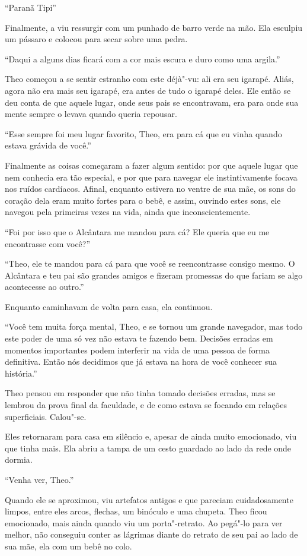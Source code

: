 ``Paranã Tipi''


Finalmente, a viu ressurgir com um punhado de barro verde na mão.
Ela esculpiu um pássaro e colocou para secar sobre uma pedra.

``Daqui a alguns dias ficará com a cor mais escura e duro como uma
argila.''

Theo começou a se sentir estranho com este déjà"-vu: ali era seu igarapé.
Aliás, agora não era mais seu igarapé, era antes de tudo o igarapé
deles. Ele então se deu conta de que aquele lugar, onde seus pais se
encontravam, era para onde sua mente sempre o levava quando queria
repousar.

``Esse sempre foi meu lugar favorito, Theo, era para cá que eu vinha
quando estava grávida de você.''

Finalmente as coisas começaram a fazer algum sentido: por que aquele
lugar que nem conhecia era tão especial, e por que para navegar ele
instintivamente focava nos ruídos cardíacos. Afinal, enquanto estivera no
ventre de sua mãe, os sons do coração dela eram muito fortes para o bebê,
e assim, ouvindo estes sons, ele navegou pela primeiras vezes na vida,
ainda que inconscientemente.

``Foi por isso que o Alcântara me mandou para cá? Ele queria que eu me
encontrasse com você?''

``Theo, ele te mandou para cá para que você se reencontrasse consigo
mesmo. O Alcântara e teu pai são grandes amigos e fizeram promessas do
que fariam se algo acontecesse ao outro.''

Enquanto caminhavam de volta para casa, ela continuou.

``Você tem muita força mental, Theo, e se tornou um grande navegador,
mas todo este poder de uma só vez não estava te fazendo bem. Decisões
erradas em momentos importantes podem interferir na vida de uma pessoa
de forma definitiva. Então nós decidimos que já estava na hora de você
conhecer sua história.''

Theo pensou em responder que não tinha tomado decisões erradas, mas se
lembrou da prova final da faculdade, e de como estava se focando em
relações superficiais. Calou"-se.

Eles retornaram para casa em silêncio e, apesar de ainda muito
emocionado, viu que tinha mais. Ela abriu a tampa de um cesto guardado
ao lado da rede onde dormia.

``Venha ver, Theo.''

Quando ele se aproximou, viu artefatos antigos e que pareciam
cuidadosamente limpos, entre eles arcos, flechas, um binóculo e uma
chupeta. Theo ficou emocionado, mais ainda quando viu um porta"-retrato.
Ao pegá"-lo para ver melhor, não conseguiu conter as lágrimas diante do
retrato de seu pai ao lado de sua mãe, ela com um bebê no colo.

